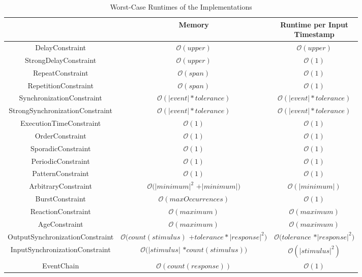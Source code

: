 	\begin{table}
		\begin{tabular}{|c|c|c|}
			\hline
			& Memory & \makecell{Runtime per Input\\Timestamp} \\
			\hline
			{DelayConstraint} & $\mathcal{O}(upper)$ & $\mathcal{O}(upper)$ \\
			\hline
			{StrongDelayConstraint} &  $\mathcal{O}(upper)$ &  $\mathcal{O}(1)$ \\
			\hline
			{RepeatConstraint} & $\mathcal{O}(span)$ & $\mathcal{O}(1)$ \\
			\hline
			{RepetitionConstraint} & $\mathcal{O}(span)$ & $\mathcal{O}(1)$ \\
			\hline
			SynchronizationConstraint & $\mathcal{O}(|event|*tolerance)$ & $\mathcal{O}(|event|*tolerance)$ \\
			\hline
			StrongSynchronizationConstraint & $\mathcal{O}(|event|*tolerance)$ & $\mathcal{O}(|event|*tolerance)$ \\
			\hline
			ExecutionTimeConstraint & $\mathcal{O}(1)$ & $\mathcal{O}(1)$ \\
			\hline
			OrderConstraint & $\mathcal{O}(1)$ & $\mathcal{O}(1)$ \\
			\hline
			SporadicConstraint & $\mathcal{O}(1)$ & $\mathcal{O}(1)$ \\
			\hline
			PeriodicConstraint & $\mathcal{O}(1)$ & $\mathcal{O}(1)$ \\
			\hline
			PatternConstraint & $\mathcal{O}(1)$ & $\mathcal{O}(1)$ \\
			\hline
			ArbitraryConstraint & \makecell{$\mathcal{O}(|minimum|^2$\\$+|minimum|)$} & $\mathcal{O}(|minimum|)$\\
			\hline
			BurstConstraint & $\mathcal{O}(maxOccurrences)$ & $\mathcal{O}(1)$ \\
			\hline
			ReactionConstraint & $\mathcal{O}(maximum)$ & $\mathcal{O}(maximum)$ \\
			\hline
			AgeConstraint & $\mathcal{O}(maximum)$ & $\mathcal{O}(maximum)$ \\
			\hline
			OutputSynchronizationConstraint& \makecell{$\mathcal{O}(count(stimulus)$\\$+tolerance*|response|^2)$} &  \makecell{$\mathcal{O}(tolerance$\\$*|response|^2)$}\\
			\hline
			InputSynchronizationConstraint& \makecell{$\mathcal{O}(|stimulus|$\\$*count(stimulus))$} & $\mathcal{O}(|stimulus|^2)$ \\
			\hline
			EventChain & $\mathcal{O}(count(response))$ & $\mathcal{O}(1)$\\
			\hline
		\end{tabular}
		\centering
		\label{tab:complexityClasses}
		\caption{Worst-Case Runtimes of the Implementations}
	\end{table}

	
	
